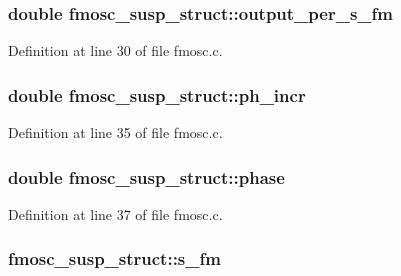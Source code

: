 \subsubsection[{\texorpdfstring{output\+\_\+per\+\_\+s\+\_\+fm}{output_per_s_fm}}]{\setlength{\rightskip}{0pt plus 5cm}double fmosc\+\_\+susp\+\_\+struct\+::output\+\_\+per\+\_\+s\+\_\+fm}\hypertarget{structfmosc__susp__struct_abe976028ca8758281dda4cb2ec9f728d}{}\label{structfmosc__susp__struct_abe976028ca8758281dda4cb2ec9f728d}


Definition at line 30 of file fmosc.\+c.

\subsubsection[{\texorpdfstring{ph\+\_\+incr}{ph_incr}}]{\setlength{\rightskip}{0pt plus 5cm}double fmosc\+\_\+susp\+\_\+struct\+::ph\+\_\+incr}\hypertarget{structfmosc__susp__struct_ad7bc073caf6e2b3523af2eff3d09c488}{}\label{structfmosc__susp__struct_ad7bc073caf6e2b3523af2eff3d09c488}


Definition at line 35 of file fmosc.\+c.

\subsubsection[{\texorpdfstring{phase}{phase}}]{\setlength{\rightskip}{0pt plus 5cm}double fmosc\+\_\+susp\+\_\+struct\+::phase}\hypertarget{structfmosc__susp__struct_a669b5dd8e8900e69a3a4c7fb4859292b}{}\label{structfmosc__susp__struct_a669b5dd8e8900e69a3a4c7fb4859292b}


Definition at line 37 of file fmosc.\+c.

\subsubsection[{\texorpdfstring{s\+\_\+fm}{s_fm}}]{ fmosc\+\_\+susp\+\_\+struct\+::s\+\_\+fm}\hypertarget{structfmosc__susp__struct_a6be8a5613e6896e92e3e69299af019cf}{}\label{structfmosc__susp__struct_a6be8a5613e6896e92e3e69299af019cf}


